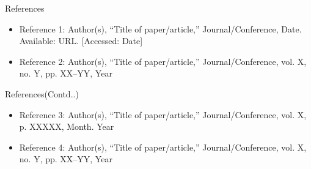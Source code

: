
\begin{frame}{References}
    \begin{itemize}
        \item Reference 1: Author(s), ``Title of paper/article,'' Journal/Conference, Date. Available: URL. [Accessed: Date]

        \item Reference 2: Author(s), ``Title of paper/article,'' Journal/Conference, vol. X, no. Y, pp. XX--YY, Year
    \end{itemize}
\end{frame}

\begin{frame}{References(Contd..)}
    \begin{itemize}
        \item Reference 3: Author(s), ``Title of paper/article,'' Journal/Conference, vol. X, p. XXXXX, Month. Year

        \item Reference 4: Author(s), ``Title of paper/article,'' Journal/Conference, vol. X, no. Y, pp. XX--YY, Year
    \end{itemize}
\end{frame}
